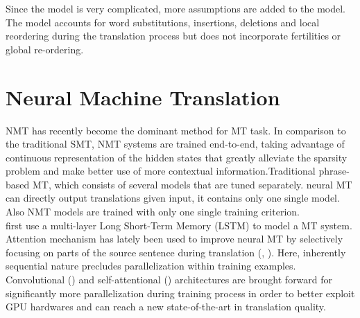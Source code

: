 Since the model is very complicated, more assumptions are added to the model. The model accounts for word substitutions, insertions, deletions and local reordering during the translation process but does not incorporate fertilities or global re-ordering.\\

%
\section{Neural Machine Translation}
NMT has recently become the dominant method for MT task. In comparison to the traditional SMT, NMT systems are trained end-to-end, taking advantage of continuous representation of the hidden states that greatly alleviate the sparsity problem and make better use of more contextual information.Traditional phrase-based MT, which consists of several models that are tuned separately. neural MT can directly output translations given input, it contains only one single model. Also NMT models are trained with only one single training criterion. \\
\cite{sutskever2014sequence} first use a multi-layer Long Short-Term Memory (LSTM) to model a MT system. Attention mechanism has lately been used to improve neural MT by selectively focusing on parts of the source sentence during translation (\cite{DBLP:journals/corr/BahdanauCB14}, \cite{luong2015effective}). Here, inherently sequential nature precludes parallelization within training examples. Convolutional (\cite{gehring2017convolutional}) and self-attentional (\cite{vaswani2017attention}) architectures are brought forward  for significantly more parallelization during training process in order to better exploit GPU hardwares and can reach a new state-of-the-art in
translation quality.


